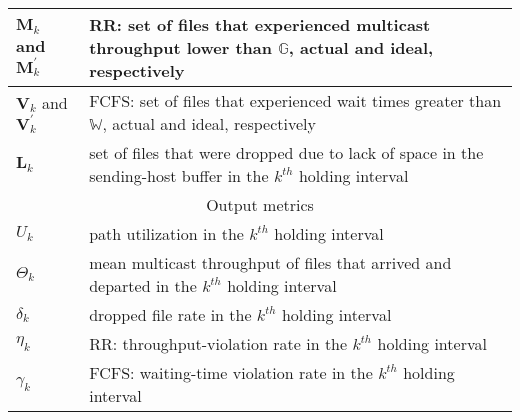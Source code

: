 \begin{table*}[!ht]
\begin{tabular}{|l|p{12.5cm}|}
$\textbf{M}_k$ and $\textbf{M}^{\prime}_k $ & RR: set of files that experienced multicast throughput lower than $\mathbb{G}$, actual and ideal, respectively\\ \hline
$\textbf{V}_k$ and $\textbf{V}^{\prime}_k $ & FCFS: set of files that experienced wait times greater than  $\mathbb{W}$, actual and ideal, respectively\\
\hline
$\textbf{L}_k$ & set of files that were dropped due to lack of space in the sending-host buffer in the $k^{th}$ holding interval \\ \hline
\multicolumn{2}{|c|}{Output metrics}\\ \hline
$U_k$ & path utilization in the $k^{th}$ holding interval \\ \hline
$\Theta_k$ & mean multicast throughput of files that arrived and departed  in the $k^{th}$ holding interval\\ \hline
$\delta_k$ & dropped file rate in the $k^{th}$ holding interval\\ \hline
$\eta_k$ & RR: throughput-violation rate in the $k^{th}$ holding interval\\ \hline
$\gamma_k$  & FCFS: waiting-time violation rate in the $k^{th}$ holding interval\\ \hline
\end{tabular}
\label{tab:notation}
\end{table*}


